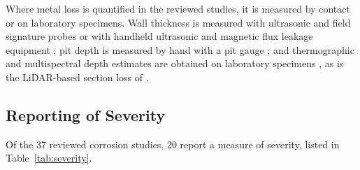 Where metal loss is quantified in the reviewed studies, it is measured by contact
or on laboratory specimens. Wall thickness is measured with ultrasonic and field
signature probes \citep{Huang2026a} or with handheld ultrasonic and magnetic flux leakage
equipment \citep{Zheng2025}; pit depth is measured by hand with a pit gauge \citep{Khodabux2021a}; and
thermographic and multispectral depth estimates are obtained on laboratory
specimens \citep{Doshvarpassand2022,Liu2021,Egodawela2025}, as is the LiDAR-based section loss of \citep{Maru2025}.

\subsection{Reporting of Severity}

Of the 37 reviewed corrosion studies, 20 report a measure of severity, listed in
Table~\ref{tab:severity}.

